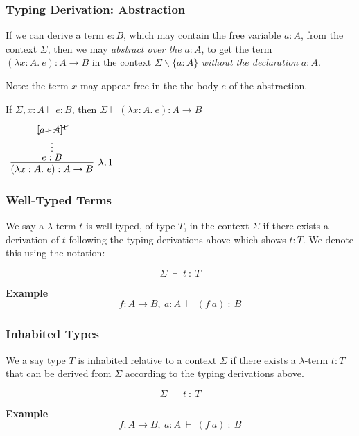 \documentclass{beamer}
\theoremstyle{indentDefn} \newtheorem{defn}[]{Definition}
\begin{document}
\begin{frame}
  \frametitle{Typing Derivation: Abstraction}

  If we can derive a term $e : B$, which may contain the free variable $a:A$, from the context $\Sigma$, then we may \emph{abstract over the} $a : A$, to get the term $(\lambda x : A. \ e) : A \to B$ in the context $\Sigma \backslash \{a:A\}$ \emph{without the declaration} $a : A$. 
  
  Note: the term $x$ may appear free in the the body $e$ of the abstraction. 

  If $\Sigma, x : A \vdash e : B$, then $\Sigma \vdash (\lambda x : A. \ e) : A \to B$

  \vspace{2cm}

  \begin{center}
    $\begin{array}{c}
        \infer[\lambda , 1]{(\lambda x : A. \ e) : A \to B}
          {\deduce[\vdots]{e : B}{\cancel{[a : A]^{1}}}}
    \end{array}$
  \end{center}

\end{frame}

\begin{frame}
  \frametitle{Well-Typed Terms}

  We say a $\lambda$-term $t$ is well-typed, of type $T$, in the context $\Sigma$ if there exists a derivation of $t$ following the typing derivations above which shows $t : T$. We denote this using the notation:

  $$\Sigma \ \vdash \ t \ : \ T$$

  {\bf Example} $$f : A \to B, \ a : A \ \vdash \ (f \ a) \ : \ B$$

  \vspace{3cm}

\end{frame}

\begin{frame}
  \frametitle{Inhabited Types}

  We a say type $T$ is inhabited relative to a context $\Sigma$ if there exists a $\lambda$-term $t : T$ that can be derived from $\Sigma$ according to the typing derivations above. 

  $$\Sigma \ \vdash \ t \ : \ T$$

  {\bf Example} $$f : A \to B, \ a : A \ \vdash \ (f \ a) \ : \ B$$

  \vspace{3cm}

\end{frame}
\end{document}
